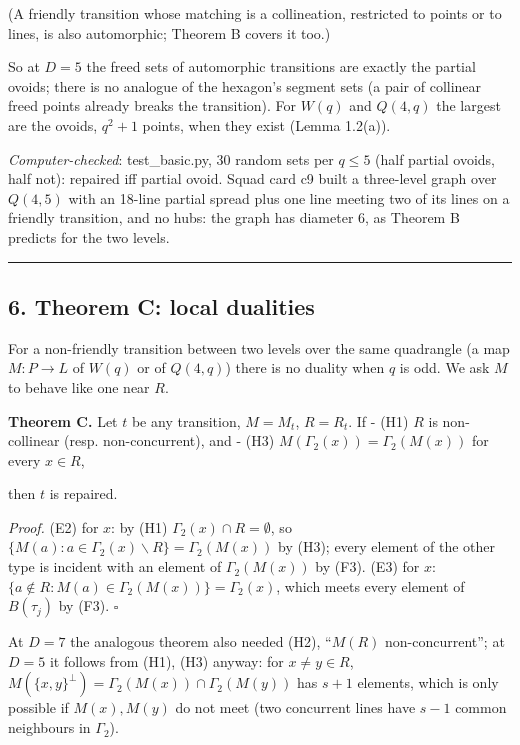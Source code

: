 \documentclass[
  11pt,
]{article}
\begin{document}
(A friendly transition whose matching is a collineation, restricted to
points or to lines, is also automorphic; Theorem B covers it too.)

So at \(D = 5\) the freed sets of automorphic transitions are exactly
the partial ovoids; there is no analogue of the hexagon's segment sets
(a pair of collinear freed points already breaks the transition). For
\(W(q)\) and \(Q(4,q)\) the largest are the ovoids, \(q^2+1\) points,
when they exist (Lemma 1.2(a)).

\emph{Computer-checked}: test\_basic.py, 30 random sets per \(q\le 5\)
(half partial ovoids, half not): repaired iff partial ovoid. Squad card
c9 built a three-level graph over \(Q(4,5)\) with an 18-line partial
spread plus one line meeting two of its lines on a friendly transition,
and no hubs: the graph has diameter 6, as Theorem B predicts for the two
levels.

\begin{center}\rule{0.5\linewidth}{0.5pt}\end{center}

\hypertarget{theorem-c-local-dualities}{%
\subsection{6. Theorem C: local
dualities}\label{theorem-c-local-dualities}}

For a non-friendly transition between two levels over the same
quadrangle (a map \(M: P\to L\) of \(W(q)\) or of \(Q(4,q)\)) there is
no duality when \(q\) is odd. We ask \(M\) to behave like one near
\(R\).

\textbf{Theorem C.} Let \(t\) be any transition, \(M = M_t\),
\(R = R_t\). If - (H1) \(R\) is non-collinear (resp. non-concurrent),
and - (H3) \(M(\Gamma_2(x)) = \Gamma_2(M(x))\) for every \(x\in R\),

then \(t\) is repaired.

\emph{Proof.} (E2) for \(x\): by (H1) \(\Gamma_2(x)\cap R = \emptyset\),
so \(\{M(a): a\in\Gamma_2(x)\smallsetminus R\} = \Gamma_2(M(x))\) by
(H3); every element of the other type is incident with an element of
\(\Gamma_2(M(x))\) by (F3). (E3) for \(x\):
\(\{a\notin R: M(a)\in\Gamma_2(M(x))\} = \Gamma_2(x)\), which meets
every element of \(B(\tau_j)\) by (F3). \(\square\)

At \(D = 7\) the analogous theorem also needed (H2), ``\(M(R)\)
non-concurrent''; at \(D = 5\) it follows from (H1), (H3) anyway: for
\(x\ne y\in R\), \(M(\{x,y\}^\perp) = \Gamma_2(M(x))\cap\Gamma_2(M(y))\)
has \(s+1\) elements, which is only possible if \(M(x),M(y)\) do not
meet (two concurrent lines have \(s-1\) common neighbours in
\(\Gamma_2\)).
\end{document}
